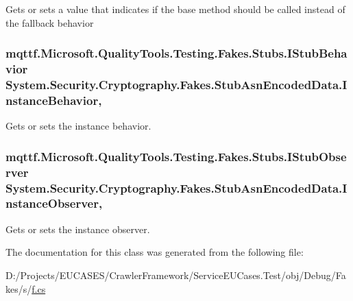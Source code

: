 Gets or sets a value that indicates if the base method should be called instead of the fallback behavior

\hypertarget{class_system_1_1_security_1_1_cryptography_1_1_fakes_1_1_stub_asn_encoded_data_ad68a850daad1da63309de1cb028576d7}{
\subsubsection[{Instance\-Behavior}]{\setlength{\rightskip}{0pt plus 5cm}mqttf.\-Microsoft.\-Quality\-Tools.\-Testing.\-Fakes.\-Stubs.\-I\-Stub\-Behavior System.\-Security.\-Cryptography.\-Fakes.\-Stub\-Asn\-Encoded\-Data.\-Instance\-Behavior\hspace{0.3cm}{\ttfamily [get]}, {\ttfamily [set]}}}\label{class_system_1_1_security_1_1_cryptography_1_1_fakes_1_1_stub_asn_encoded_data_ad68a850daad1da63309de1cb028576d7}


Gets or sets the instance behavior.

\hypertarget{class_system_1_1_security_1_1_cryptography_1_1_fakes_1_1_stub_asn_encoded_data_a96634fe32956fc5a4a3fd34b60156d7c}{
\subsubsection[{Instance\-Observer}]{\setlength{\rightskip}{0pt plus 5cm}mqttf.\-Microsoft.\-Quality\-Tools.\-Testing.\-Fakes.\-Stubs.\-I\-Stub\-Observer System.\-Security.\-Cryptography.\-Fakes.\-Stub\-Asn\-Encoded\-Data.\-Instance\-Observer\hspace{0.3cm}{\ttfamily [get]}, {\ttfamily [set]}}}\label{class_system_1_1_security_1_1_cryptography_1_1_fakes_1_1_stub_asn_encoded_data_a96634fe32956fc5a4a3fd34b60156d7c}


Gets or sets the instance observer.



The documentation for this class was generated from the following file\-:\begin{DoxyCompactItemize}
\item 
D\-:/\-Projects/\-E\-U\-C\-A\-S\-E\-S/\-Crawler\-Framework/\-Service\-E\-U\-Cases.\-Test/obj/\-Debug/\-Fakes/s/\hyperlink{s_2f_8cs}{f.\-cs}\end{DoxyCompactItemize}

